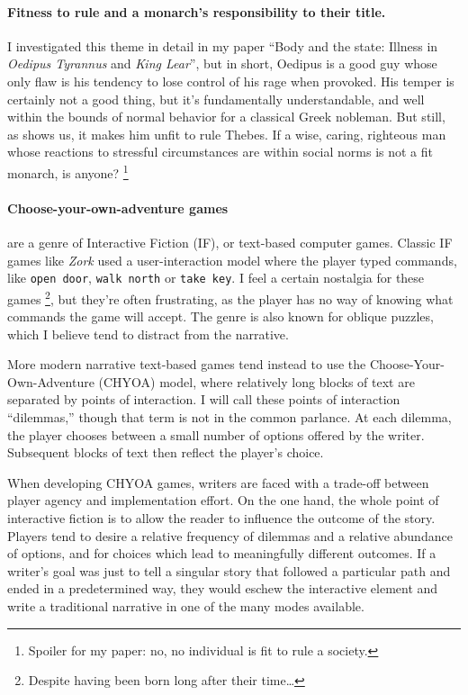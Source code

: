 \paragraph*{Fitness to rule and a monarch's responsibility to their title.} I investigated
this theme in detail in my paper \enquote{Body and the state: Illness in \textit{Oedipus
    Tyrannus} and \textit{King Lear}}, but in short, Oedipus is a good guy whose only flaw
is his tendency to lose control of his rage when provoked. His temper is certainly not a
good thing, but it's fundamentally understandable, and well within the bounds of normal
behavior for a classical Greek nobleman. But still, as \theplay{} shows us, it makes him
unfit to rule Thebes. If a wise, caring, righteous man whose reactions to stressful
circumstances are within social norms is not a fit monarch, is anyone?  \footnote{Spoiler
  for my paper: no, no individual is fit to rule a society.}


\paragraph*{Choose-your-own-adventure games} are a genre of Interactive Fiction (IF), or
text-based computer games. Classic IF games like \textit{Zork} used a user-interaction
model where the player typed commands, like \texttt{open door}, \texttt{walk north} or
\texttt{take key}. I feel a certain nostalgia for these games \footnote{Despite having
  been born long after their time\ldots{}}, but they're often frustrating, as the player
has no way of knowing what commands the game will accept. The genre is also known for
oblique puzzles, which I believe tend to distract from the narrative.

More modern narrative text-based games tend instead to use the Choose-Your-Own-Adventure
(CHYOA) model, where relatively long blocks of text are separated by points of
interaction. I will call these points of interaction \enquote{dilemmas,} though that term
is not in the common parlance. At each dilemma, the player chooses between a small number
of options offered by the writer. Subsequent blocks of text then reflect the player's
choice.

When developing CHYOA games, writers are faced with a trade-off between player agency and
implementation effort. On the one hand, the whole point of interactive fiction is to allow
the reader to influence the outcome of the story. Players tend to desire a relative
frequency of dilemmas and a relative abundance of options, and for choices which lead to
meaningfully different outcomes. If a writer's goal was just to tell a singular story that
followed a particular path and ended in a predetermined way, they would eschew the
interactive element and write a traditional narrative in one of the many modes available.

